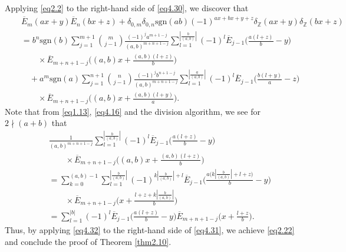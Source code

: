 \documentclass[reqno]{amsart}
\numberwithin{equation}{section}
\begin{document}
Applying \eqref{eq2.2} to the right-hand side of \eqref{eq4.30}, we discover that
\begin{eqnarray}\label{eq4.31}
&&\overline{E}_{m}(ax+y)\overline{E}_{n}(bx+z)+\delta_{0,m}\delta_{0,n}\mathrm{sgn}(ab)(-1)^{ax+bx+y+z}\delta_{\mathbb{Z}}(ax+y)\delta_{\mathbb{Z}}(bx+z)\nonumber\\
&&=b^{n}\mathrm{sgn}(b)
\sum_{j=1}^{m+1}\binom{m}{j-1}\frac{(-1)^{j}a^{m+1-j}}{(a,b)^{m+n+1-j}}\sum_{l=1}^{|\frac{b}{(a,b)}|}(-1)^{l}
\overline{E}_{j-1}\biggl(\frac{a(l+z)}{b}-y\biggl)\nonumber\\
&&\qquad\times\overline{E}_{m+n+1-j}\biggl((a,b)x+\frac{(a,b)(l+z)}{b}\biggl)\nonumber\\
&&\quad+a^{m}\mathrm{sgn}(a)\sum_{j=1}^{n+1}\binom{n}{j-1}\frac{(-1)^{j}b^{n+1-j}}{(a,b)^{m+n+1-j}}
\sum_{l=1}^{|\frac{a}{(a,b)}|}(-1)^{l}\overline{E}_{j-1}\biggl(\frac{b(l+y)}{a}-z\biggl)\nonumber\\
&&\qquad\times\overline{E}_{m+n+1-j}\biggl((a,b)x+\frac{(a,b)(l+y)}{a}\biggl).
\end{eqnarray}
Note that from \eqref{eq1.13}, \eqref{eq4.16} and the
division algorithm, we see for $2\nmid (a+b)$ that
\begin{eqnarray}\label{eq4.32}
&&\frac{1}{(a,b)^{m+n+1-j}}\sum_{l=1}^{|\frac{b}{(a,b)}|}(-1)^{l}
\overline{E}_{j-1}\biggl(\frac{a(l+z)}{b}-y\biggl)\nonumber\\
&&\qquad\times\overline{E}_{m+n+1-j}\biggl((a,b)x+\frac{(a,b)(l+z)}{b}\biggl)\nonumber\\
&&=\sum_{k=0}^{(a,b)-1}\sum_{l=1}^{|\frac{b}{(a,b)}|}(-1)^{k|\frac{b}{(a,b)}|+l}\overline{E}_{j-1}\biggl(\frac{a\bigl(k|\frac{b}{(a,b)}|+l+z\bigl)}{b}-y\biggl)\nonumber\\
&&\qquad\times\overline{E}_{m+n+1-j}\biggl(x+\frac{l+z+k|\frac{b}{(a,b)}|}{b}\biggl)\nonumber\\
&&=\sum_{l=1}^{|b|}(-1)^{l}\overline{E}_{j-1}\biggl(\frac{a(l+z)}{b}-y\biggl)\overline{E}_{m+n+1-j}\biggl(x+\frac{l+z}{b}\biggl).
\end{eqnarray}
Thus, by applying \eqref{eq4.32} to the right-hand side of \eqref{eq4.31}, we achieve \eqref{eq2.22} and conclude the proof of Theorem \ref{thm2.10}.
\end{document}
